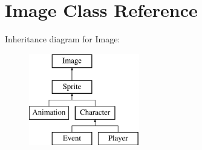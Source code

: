 \hypertarget{classImage}{\section{Image Class Reference}
\label{classImage}
}
Inheritance diagram for Image\-:\begin{figure}[H]
\begin{center}
\leavevmode
\includegraphics[height=4.000000cm]{classImage}
\end{center}
\end{figure}
